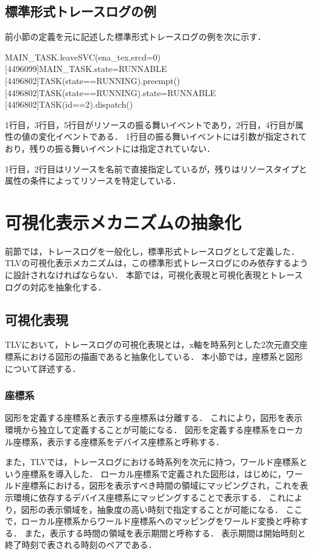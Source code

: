 \subsection{標準形式トレースログの例}

前小節の定義を元に記述した標準形式トレースログの例を次に示す．

\begin{File}
[2403010]MAIN_TASK.leaveSVC(ena_tex,ercd=0)
[4496099]MAIN_TASK.state=RUNNABLE
[4496802]TASK(state==RUNNING).preempt()
[4496802]TASK(state==RUNNING).state=RUNNABLE
[4496802]TASK(id==2).dispatch()
\end{File}

1行目，3行目，5行目がリソースの振る舞いイベントであり，2行目，4行目が属性の値の変化イベントである．
1行目の振る舞いイベントには引数が指定されており，残りの振る舞いイベントには指定されていない．

1行目，2行目はリソースを名前で直接指定しているが，残りはリソースタイプと属性の条件によってリソースを特定している．

\section{可視化表示メカニズムの抽象化}

前節では，トレースログを一般化し，標準形式トレースログとして定義した．
TLVの可視化表示メカニズムは，この標準形式トレースログにのみ依存するように設計されなければならない．
本節では，可視化表現と可視化表現とトレースログの対応を抽象化する．

\subsection{可視化表現}
\label{subsec:visualization}

TLVにおいて，トレースログの可視化表現とは，x軸を時系列とした2次元直交座標系における図形の描画であると抽象化している．
本小節では，座標系と図形について詳述する．

\subsubsection{座標系}

図形を定義する座標系と表示する座標系は分離する．
これにより，図形を表示環境から独立して定義することが可能になる．
図形を定義する座標系をローカル座標系，表示する座標系をデバイス座標系と呼称する．

また，TLVでは，トレースログにおける時系列を次元に持つ，ワールド座標系という座標系を導入した．
ローカル座標系で定義された図形は，はじめに，ワールド座標系における，図形を表示すべき時間の領域にマッピングされ，これを表示環境に依存するデバイス座標系にマッピングすることで表示する．
これにより，図形の表示領域を，抽象度の高い時刻で指定することが可能になる．
ここで，ローカル座標系からワールド座標系へのマッピングをワールド変換と呼称する．
また，表示する時間の領域を表示期間と呼称する．
表示期間は開始時刻と終了時刻で表される時刻のペアである．

